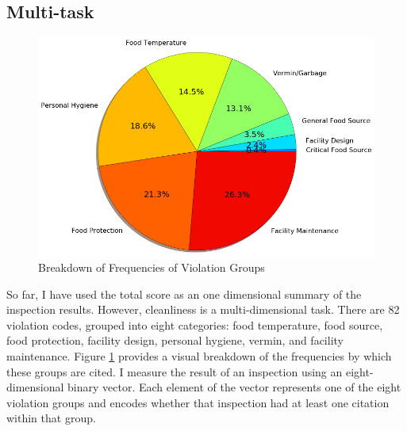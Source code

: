 \documentclass[10pt]{article} %
\begin{document}
\subsection{Multi-task}

\begin{figure}[htbp]
\centering
\includegraphics[scale = 0.3]{Figures/viol_group_pie.png}
\caption{Breakdown of Frequencies of Violation Groups}
\label{task_pie}
\end{figure}

So far, I have used the total score as an one dimensional summary of the inspection results. However, cleanliness is a multi-dimensional task. There are 82 violation codes, grouped into eight categories: food temperature, food source, food protection, facility design, personal hygiene, vermin, and facility maintenance. Figure \ref{task_pie} provides a visual breakdown of the frequencies by which these groups are cited. I measure the result of an inspection using an eight-dimensional binary vector. Each element of the vector represents one of the eight violation groups and encodes whether that inspection had at least one citation within that group. 
\end{document}
